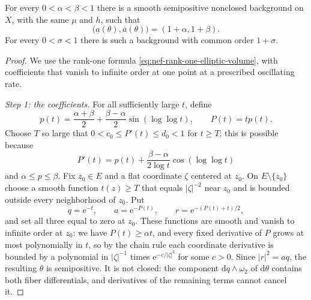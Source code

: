 \begin{proposition}\label{prop:nef-oscillatory-orders}
For every $0<\alpha<\beta<1$ there is a smooth semipositive nonclosed background on $X$, with the same $\mu$ and $h$, such that
\[
 \bigl(\underline a(\theta),\overline a(\theta)\bigr)
 =(1+\alpha,1+\beta).
\]
For every $0<\sigma<1$ there is such a background with common order $1+\sigma$.
\end{proposition}

\begin{proof}
We use the rank-one formula \eqref{eq:nef-rank-one-elliptic-volume}, with coefficients that vanish to infinite order at one point at a prescribed oscillating rate.

\emph{Step 1: the coefficients.} For all sufficiently large $t$, define
\[
 p(t)=\frac{\alpha+\beta}{2}
 +\frac{\beta-\alpha}{2}\sin(\log\log t),\qquad P(t)=tp(t).
\]
Choose $T$ so large that $0<c_0\leq P'(t)\leq d_0<1$ for $t\geq T$; this is possible because
\[
 P'(t)=p(t)+\frac{\beta-\alpha}{2\log t}\cos(\log\log t)
\]
and $\alpha\leq p\leq\beta$. Fix $z_0\in E$ and a flat coordinate $\zeta$ centered at $z_0$. On $E\setminus\{z_0\}$ choose a smooth function $t(z)\geq T$ that equals $|\zeta|^{-2}$ near $z_0$ and is bounded outside every neighborhood of $z_0$. Put
\[
 q=\mathrm{e}^{-t},\qquad a=\mathrm{e}^{-P(t)},\qquad
 r=\mathrm{e}^{-(P(t)+t)/2},
\]
and set all three equal to zero at $z_0$. These functions are smooth and vanish to infinite order at $z_0$: we have $P(t)\geq\alpha t$, and every fixed derivative of $P$ grows at most polynomially in $t$, so by the chain rule each coordinate derivative is bounded by a polynomial in $|\zeta|^{-1}$ times $\mathrm{e}^{-c/|\zeta|^2}$ for some $c>0$. Since $|r|^2=aq$, the resulting $\theta$ is semipositive. It is not closed: the component $\mathrm{d} q\wedge\omega_2$ of $\mathrm{d}\theta$ contains both fiber differentials, and derivatives of the remaining terms cannot cancel it.


\end{proof}
